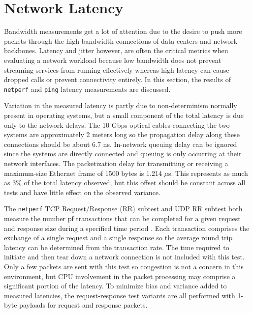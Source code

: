 

\section{Network Latency} %
\label{sec:networklatency}
Bandwidth measurements get a lot of attention due to the desire to push more packets through the high-bandwidth connections of data centers and network backbones.
Latency and jitter however, are often the critical metrics when evaluating a network workload because low bandwidth does not prevent streaming services from running effectively whereas high latency can cause dropped calls or prevent connectivity entirely.
In this section, the results of \texttt{netperf} and \texttt{ping} latency measurements are discussed.  

Variation in the measured latency is partly due to non-determinism normally present in operating systems, but a small component of the total latency is due only to the network delays.
The 10 Gbps optical cables connecting the two systems are approximately 2 meters long so the propagation delay along these connections should be about 6.7 ns.
In-network queuing delay can be ignored since the systems are directly connected and queuing is only occurring at their network interfaces.
The packetization delay for transmitting or receiving a maximum-size Ethernet frame of 1500 bytes is 1.214 $\mu$s.
This represents as much as 3\% of the total latency observed, but this offset should be constant across all tests and have little effect on the observed variance. 

The \texttt{netperf} TCP Request/Response (RR) subtest and UDP RR subtest both measure the number pf transactions that can be completed for a given request and response size during a specified time period \autocite{netperfTraining}.
Each transaction comprises the exchange of a single request and a single response so the average round trip latency can be determined from the transaction rate.  
The time required to initiate and then tear down a network connection is not included with this test.  
Only a few packets are sent with this test so congestion is not a concern in this environment, but CPU involvement in the packet processing may comprise a significant portion of the latency.  
To minimize bias and variance added to measured latencies, the request-response test variants are all performed with 1-byte payloads for request and response packets.

